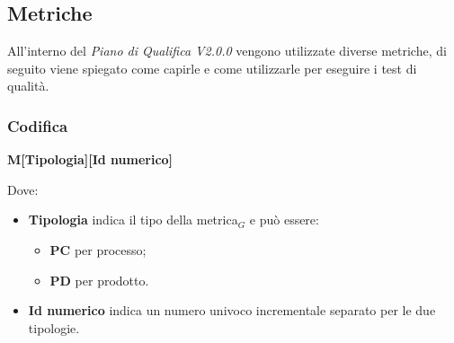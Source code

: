   \subsection{Metriche}\label{sec:Metriche}
  All'interno del \textit{Piano di Qualifica V2.0.0} vengono utilizzate diverse metriche, di seguito viene spiegato come capirle e come utilizzarle per
  eseguire i test di qualità.
  \subsubsection{Codifica}
  \begin{center}
      \textbf{M[Tipologia][Id numerico]}
  \end{center}
  Dove:
    \begin{itemize}
        \item \textbf{Tipologia} indica il tipo della metrica$_G$ e può essere:
                \begin{itemize}
                    \item \textbf{PC} per processo;
                    \item \textbf{PD} per prodotto.
                \end{itemize}
        \item \textbf{Id numerico} indica un numero univoco incrementale separato per le due tipologie.
    \end{itemize}
